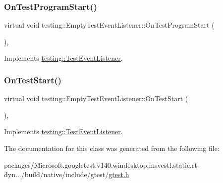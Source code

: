 \subsubsection{\texorpdfstring{OnTestProgramStart()}{OnTestProgramStart()}}
{\footnotesize\ttfamily virtual void testing\+::\+Empty\+Test\+Event\+Listener\+::\+On\+Test\+Program\+Start (\begin{DoxyParamCaption}\item[{const \mbox{\hyperlink{classtesting_1_1_unit_test}{Unit\+Test}} \&}]{ }\end{DoxyParamCaption})\hspace{0.3cm}{\ttfamily [inline]}, {\ttfamily [virtual]}}



Implements \mbox{\hyperlink{classtesting_1_1_test_event_listener_a5f6c84f39851e8a603a2d2e10063816b}{testing\+::\+Test\+Event\+Listener}}.

\mbox{\label{classtesting_1_1_empty_test_event_listener_a84fa74cc9ba742f9f847ea405ca84e5e}} 
\subsubsection{\texorpdfstring{OnTestStart()}{OnTestStart()}}
{\footnotesize\ttfamily virtual void testing\+::\+Empty\+Test\+Event\+Listener\+::\+On\+Test\+Start (\begin{DoxyParamCaption}\item[{const \mbox{\hyperlink{classtesting_1_1_test_info}{Test\+Info}} \&}]{ }\end{DoxyParamCaption})\hspace{0.3cm}{\ttfamily [inline]}, {\ttfamily [virtual]}}



Implements \mbox{\hyperlink{classtesting_1_1_test_event_listener_ab4f6a0ca16ae75daf385b3b5914e1048}{testing\+::\+Test\+Event\+Listener}}.



The documentation for this class was generated from the following file\+:\begin{DoxyCompactItemize}
\item 
packages/\+Microsoft.\+googletest.\+v140.\+windesktop.\+msvcstl.\+static.\+rt-\/dyn.../build/native/include/gtest/\mbox{\hyperlink{gtest_8h}{gtest.\+h}}\end{DoxyCompactItemize}
